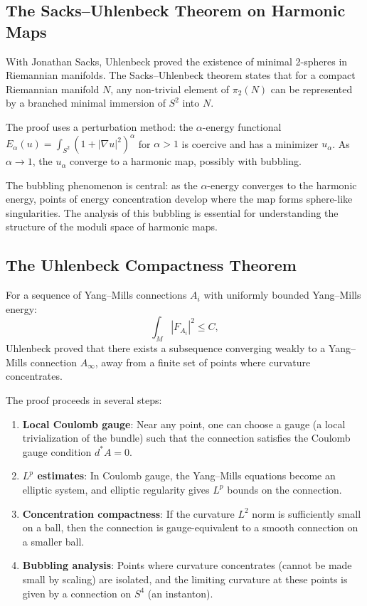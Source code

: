\subsection{The Sacks--Uhlenbeck Theorem on Harmonic Maps}

With Jonathan Sacks, Uhlenbeck proved the existence of minimal 2-spheres in Riemannian manifolds. The Sacks--Uhlenbeck theorem states that for a compact Riemannian manifold $N$, any non-trivial element of $\pi_2(N)$ can be represented by a branched minimal immersion of $S^2$ into $N$.

The proof uses a perturbation method: the $\alpha$-energy functional $E_\alpha(u) = \int_{S^2} (1 + |\nabla u|^2)^\alpha$ for $\alpha > 1$ is coercive and has a minimizer $u_\alpha$. As $\alpha \to 1$, the $u_\alpha$ converge to a harmonic map, possibly with bubbling.

The bubbling phenomenon is central: as the $\alpha$-energy converges to the harmonic energy, points of energy concentration develop where the map forms sphere-like singularities. The analysis of this bubbling is essential for understanding the structure of the moduli space of harmonic maps.

\subsection{The Uhlenbeck Compactness Theorem}

For a sequence of Yang--Mills connections $A_i$ with uniformly bounded Yang--Mills energy:
\[
\int_M |F_{A_i}|^2 \leq C,
\]
Uhlenbeck proved that there exists a subsequence converging weakly to a Yang--Mills connection $A_\infty$, away from a finite set of points where curvature concentrates.

The proof proceeds in several steps:
\begin{enumerate}
\item \textbf{Local Coulomb gauge}: Near any point, one can choose a gauge (a local trivialization of the bundle) such that the connection satisfies the Coulomb gauge condition $d^* A = 0$.
\item \textbf{$L^p$ estimates}: In Coulomb gauge, the Yang--Mills equations become an elliptic system, and elliptic regularity gives $L^p$ bounds on the connection.
\item \textbf{Concentration compactness}: If the curvature $L^2$ norm is sufficiently small on a ball, then the connection is gauge-equivalent to a smooth connection on a smaller ball.
\item \textbf{Bubbling analysis}: Points where curvature concentrates (cannot be made small by scaling) are isolated, and the limiting curvature at these points is given by a connection on $S^4$ (an instanton).
\end{enumerate}

